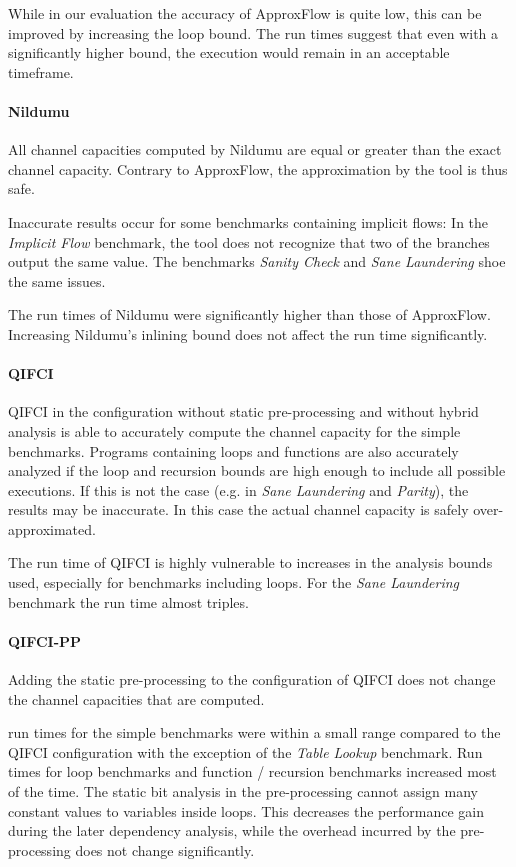 While in our evaluation the accuracy of ApproxFlow is quite low, this can be improved by increasing the loop bound. The run times suggest that even with a significantly higher bound, the execution would remain in an acceptable timeframe.

\paragraph{Nildumu}
All channel capacities computed by Nildumu are equal or greater than the exact channel capacity. Contrary to ApproxFlow, the approximation by the tool is thus safe.

Inaccurate results occur for some benchmarks containing implicit flows: In the \emph{Implicit Flow} benchmark, the tool does not recognize that two of the branches output the same value. The benchmarks \emph{Sanity Check} and \emph{Sane Laundering} shoe the same issues.

The run times of Nildumu were significantly higher than those of ApproxFlow. Increasing Nildumu's inlining bound does not affect the run time significantly.

\paragraph{QIFCI}
QIFCI in the configuration without static pre-processing and without hybrid analysis is able to accurately compute the channel capacity for the simple benchmarks. Programs containing loops and functions are also accurately analyzed if the loop and recursion bounds are high enough to include all possible executions. If this is not the case (e.g. in \emph{Sane Laundering} and \emph{Parity}), the results may be inaccurate. In this case the actual channel capacity is safely over-approximated.

The run time of QIFCI is highly vulnerable to increases in the analysis bounds used, especially for benchmarks including loops. For the \emph{Sane Laundering} benchmark the run time almost triples.

\paragraph{QIFCI-PP}
Adding the static pre-processing to the configuration of QIFCI does not change the channel capacities that are computed.

run times for the simple benchmarks were within a small range compared to the QIFCI configuration with the exception of the \emph{Table Lookup} benchmark. Run times for loop benchmarks and function / recursion benchmarks increased most of the time. The static bit analysis in the pre-processing cannot assign many constant values to variables inside loops. This decreases the performance gain during the later dependency analysis, while the overhead incurred by the pre-processing does not change significantly.

